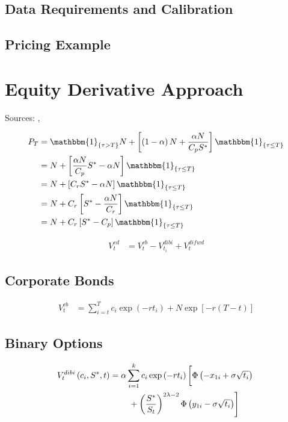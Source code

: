 \subsection{Data Requirements and Calibration}

\subsection{Pricing Example}

\section{Equity Derivative Approach}
Sources: \cite{erismann2015pricing}, \cite{de2011pricing}

\begin{align}
    P_T &= \mathbbm{1}_{\{ \tau > T \}} N +\left[ \left( 1 - \alpha \right) N + \dfrac{\alpha N}{C_p S^*} \right] \mathbbm{1}_{\{ \tau \leq T \}}\nonumber\\
    &= N + \left[ \dfrac{\alpha N}{C_p} S^* - \alpha N \right] \mathbbm{1}_{\{ \tau \leq T \}}\nonumber\\
    &= N + \left[ C_r S^* - \alpha N \right] \mathbbm{1}_{\{ \tau \leq T \}}\nonumber\\
    &= N + C_r \left[S^* - \dfrac{\alpha N}{C_r}\right] \mathbbm{1}_{\{ \tau \leq T \}}\nonumber\\
    &= N + C_r \left[ S^* - C_p \right] \mathbbm{1}_{\{ \tau \leq T \}}\nonumber
\end{align}

\begin{align}
    V^{ed}_t &= V^{cb}_t - V_{t_i}^{dibi} + V_t^{difwd}
\end{align}

\subsection{Corporate Bonds}
\begin{align}
    V^{cb}_t &= \sum^T_{i=t}c_i \exp\left(-r t_i\right) + N \exp\left[-r\left(T-t\right)\right]
\end{align}

\subsection{Binary Options}

\begin{align}
    V_t^{dibi}\left( c_i, S^*, t \right) &= \alpha \sum^k_{i=1} c_i \exp\left(-r t_i\right) \left[ \Phi\left(-x_{1i} + \sigma \sqrt{t_i}\right)\vphantom{\dfrac{S^*}{S}}\right.\nonumber\\
   &\qquad \left.\vphantom{\dfrac{S^*}{S_t}} +\left(\dfrac{S^*}{S_t}\right)^{2\lambda -2} \Phi\left(y_{1i} - \sigma \sqrt{t_i}\right) \right]
\end{align}

